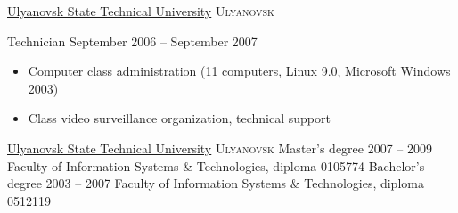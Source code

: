 \documentclass[unicode, 10pt, a4paper, oneside, fleqn]{article}
\begin{document}

\job
    {\href{http://www.ulstu.ru}{Ulyanovsk State Technical University}}
    {\textsc{Ulyanovsk}}
    {
        \position
            {Technician}
            {September 2006 -- September 2007}
            {
                \begin{itemize}
                    \item{Computer class administration (11 computers,
                           Linux 9.0, Microsoft Windows 2003})
                    \item{Class video surveillance organization, technical support}
                \end{itemize}
            }
    }


\newpage


\job
    {\href{http://www.ulstu.ru}{Ulyanovsk State Technical University}}
    {\textsc{Ulyanovsk}}
    {
        \positionnobreak
            {Master's degree}
            {2007 -- 2009}
            {Faculty of Information Systems \& Technologies, diploma  0105774}
        \positionnobreak
            {Bachelor's degree}
            {2003 -- 2007}
            {Faculty of Information Systems \& Technologies, diploma  0512119}
    }

\end{document}
